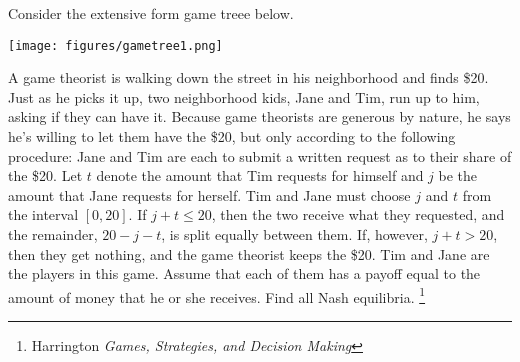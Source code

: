 \documentclass[addpoints ]{exam}
\begin{document}
\begin{questions}
\question
Consider the extensive form game treee below.

\begin{center}
  \texttt{[image: figures/gametree1.png]}
\end{center}


\newpage


\question[10] 
A game theorist is walking down the street in his neighborhood and finds \$20.
Just as he picks it up, two neighborhood kids, 
Jane and Tim,
run up to him, asking if they can have it.
Because game theorists are generous by nature, 
he says he's willing to let them have the \$20,
but only according to the following procedure:
Jane and Tim are each to submit a written request 
as to their share of the \$20. 
Let $t$ denote the amount that Tim requests for himself
and $j$ be the amount that Jane requests for herself.
Tim and Jane must choose $j$ and $t$ from the interval
$[0,20]$.
If $j + t \leq 20$, then the two receive what they requested,
and the remainder, $20 - j - t$, is split equally between them.
If, however, $j + t > 20$, then they get nothing, and the game theorist keeps the \$20.
Tim and Jane are the players in this game.
Assume that each of them has a payoff equal to the amount of money that he or she receives. 
Find all Nash equilibria.
\footnote{Harrington \textit{Games, Strategies, and Decision Making}}


\end{questions}
\end{document}

